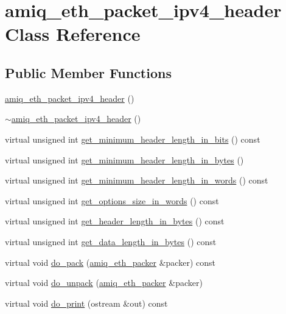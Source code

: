 \hypertarget{classamiq__eth__packet__ipv4__header}{
\section{amiq\_\-eth\_\-packet\_\-ipv4\_\-header Class Reference}
\label{classamiq__eth__packet__ipv4__header}
}
\subsection*{Public Member Functions}
\begin{DoxyCompactItemize}
\item 
\hyperlink{classamiq__eth__packet__ipv4__header_aa149a70e2d1e46b5a676fdda303b86bb}{amiq\_\-eth\_\-packet\_\-ipv4\_\-header} ()
\item 
\hyperlink{classamiq__eth__packet__ipv4__header_a6daae16cb693db34fe01bb601cb45bb1}{$\sim$amiq\_\-eth\_\-packet\_\-ipv4\_\-header} ()
\item 
virtual unsigned int \hyperlink{classamiq__eth__packet__ipv4__header_a3e9b9781d9edc8dc3c6579439a9fb537}{get\_\-minimum\_\-header\_\-length\_\-in\_\-bits} () const 
\item 
virtual unsigned int \hyperlink{classamiq__eth__packet__ipv4__header_a9678136b08ef617c2b2db99745155207}{get\_\-minimum\_\-header\_\-length\_\-in\_\-bytes} ()
\item 
virtual unsigned int \hyperlink{classamiq__eth__packet__ipv4__header_a2f853ab62e598a7e7ea8240ba959430f}{get\_\-minimum\_\-header\_\-length\_\-in\_\-words} () const 
\item 
virtual unsigned int \hyperlink{classamiq__eth__packet__ipv4__header_aef70a380caba7a48db3391ebc7e89637}{get\_\-options\_\-size\_\-in\_\-words} () const 
\item 
virtual unsigned int \hyperlink{classamiq__eth__packet__ipv4__header_acfb6bc2bf22a9465b410bce2c9ad48bc}{get\_\-header\_\-length\_\-in\_\-bytes} () const 
\item 
virtual unsigned int \hyperlink{classamiq__eth__packet__ipv4__header_a0af563bb75c1d671878c550927656a12}{get\_\-data\_\-length\_\-in\_\-bytes} () const 
\item 
virtual void \hyperlink{classamiq__eth__packet__ipv4__header_a614be36fe34072ca8e260dd7ae7567ad}{do\_\-pack} (\hyperlink{classamiq__eth__packer}{amiq\_\-eth\_\-packer} \&packer) const 
\item 
virtual void \hyperlink{classamiq__eth__packet__ipv4__header_a4852822c4486879107ba944d7d649e68}{do\_\-unpack} (\hyperlink{classamiq__eth__packer}{amiq\_\-eth\_\-packer} \&packer)
\item 
virtual void \hyperlink{classamiq__eth__packet__ipv4__header_ae3c2ee52b4d7ee6950e76559fd3fcabf}{do\_\-print} (ostream \&out) const 
\end{DoxyCompactItemize}
